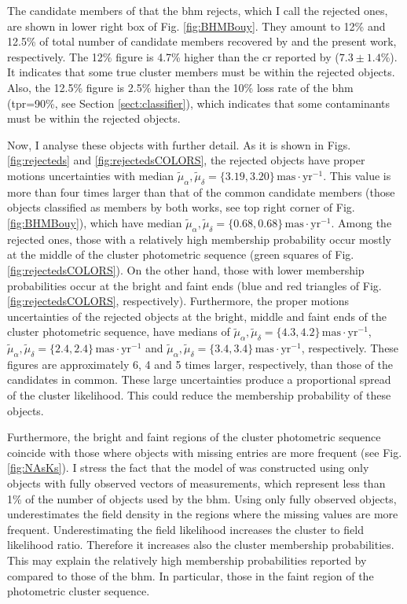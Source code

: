 The candidate members of \citet{Bouy2015} that the \gls{bhm} rejects, which I call the rejected ones, are shown in lower right box of Fig. \ref{fig:BHMBouy}. They amount to 12\% and 12.5\% of total number of candidate members recovered by \citet{Bouy2015} and the present work, respectively. The 12\% figure is 4.7\% higher than the \gls{cr} reported by \citet{Sarro2014} ($7.3\pm1.4$\%). It indicates that some true cluster members must be within the rejected objects. Also, the 12.5\% figure is 2.5\% higher than the 10\% loss rate of the \gls{bhm} (\gls{tpr}=90\%, see Section \ref{sect:classifier}), which indicates that some contaminants must be within the rejected objects.

Now, I analyse these objects with further detail. As it is shown in Figs. \ref{fig:rejecteds} and \ref{fig:rejectedsCOLORS}, the rejected objects have proper motions uncertainties with median $\tilde{\mu}_{\alpha},\tilde{\mu}_{\delta}=\{3.19,3.20\} \,\mathrm{mas\cdot yr^{-1}}$. This value is more than four times larger than that of the common candidate members (those objects classified as members by both works, see top right corner of Fig. \ref{fig:BHMBouy}), which have median $\tilde{\mu}_{\alpha},\tilde{\mu}_{\delta}=\{0.68,0.68\} \,\mathrm{mas\cdot yr^{-1}}$. Among the rejected ones, those with a relatively high membership probability occur mostly at the middle of the cluster photometric sequence (green squares of Fig. \ref{fig:rejectedsCOLORS}). On the other hand, those with lower membership probabilities occur at the bright and faint ends (blue and red triangles of Fig. \ref{fig:rejectedsCOLORS}, respectively). Furthermore, the proper motions uncertainties of the rejected objects at the bright, middle and faint ends of the cluster photometric sequence, have medians of $\tilde{\mu}_{\alpha},\tilde{\mu}_{\delta}=\{4.3,4.2\}  \,\mathrm{mas\cdot yr^{-1}}$, $\tilde{\mu}_{\alpha},\tilde{\mu}_{\delta}=\{2.4,2.4\}\,\mathrm{mas\cdot yr^{-1}}$ and $\tilde{\mu}_{\alpha},\tilde{\mu}_{\delta}=\{3.4,3.4\}\,\mathrm{mas\cdot yr^{-1}}$, respectively. These figures are approximately 6, 4 and 5 times larger, respectively, than those of the candidates in common. These large uncertainties produce a proportional spread of the cluster likelihood. This could reduce the membership probability of these objects.

Furthermore, the bright and faint regions of the cluster photometric sequence coincide with those where objects with missing entries are more frequent (see Fig. \ref{fig:NAsKs}). I stress the fact that the model of \citet{Bouy2015} was constructed using only objects with fully observed vectors of measurements, which represent less than 1\% of the number of objects used by the \gls{bhm}. Using only fully observed objects, underestimates the field density in the regions where the missing values are more frequent. Underestimating the field likelihood increases the cluster to field likelihood ratio. Therefore it increases also the cluster membership probabilities. This may explain the relatively high membership probabilities reported by \citet{Bouy2015} compared to those of the \gls{bhm}. In particular, those in the faint region of the photometric cluster sequence. 

